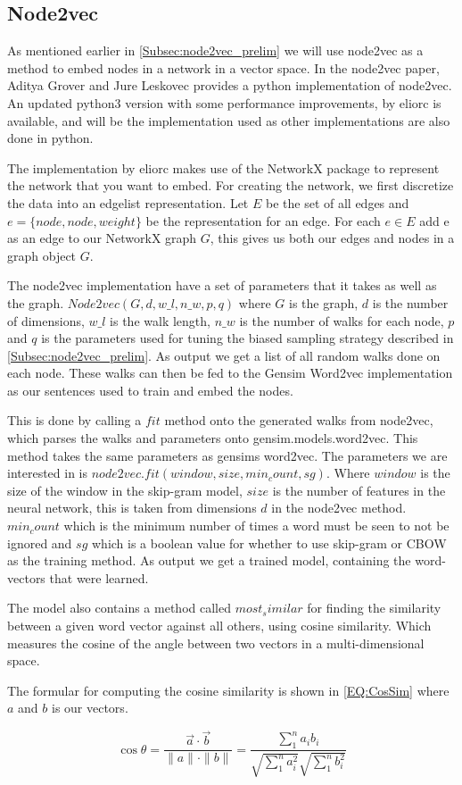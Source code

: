\subsection{Node2vec}
\label{Subsec:n2v_implementation}
As mentioned earlier in \ref{Subsec:node2vec_prelim} we will use node2vec as a method to embed nodes in a network in a vector space. In the node2vec paper, Aditya Grover and Jure Leskovec provides a python implementation of node2vec. An updated python3 version with some performance improvements, by eliorc\cite{n2v.eliorc} is available, and will be the implementation used as other implementations are also done in python.

The implementation by eliorc makes use of the NetworkX package to represent the network that you want to embed. For creating the network, we first discretize the data into an edgelist representation. Let $E$ be the set of all edges and $e = \{node, node, weight\}$ be the representation for an edge. For each $e \in E$ add e as an edge to our NetworkX graph $G$, this gives us both our edges and nodes in a graph object $G$.

The node2vec implementation have a set of parameters that it takes as well as the graph. $Node2vec(G, d, w\_l, n\_w, p, q)$ where $G$ is the graph, $d$ is the number of dimensions, $w\_l$ is the walk length, $n\_w$ is the number of walks for each node, $p$ and $q$ is the parameters used for tuning the biased sampling strategy described in \ref{Subsec:node2vec_prelim}. As output we get a list of all random walks done on each node. These walks can then be fed to the Gensim Word2vec\cite{Gensim.Word2vec} implementation as our sentences used to train and embed the nodes.

This is done by calling a $fit$ method onto the generated walks from node2vec, which parses the walks and parameters onto gensim.models.word2vec\cite{Gensim.Word2vec}. This method takes the same parameters as gensims word2vec. The parameters we are interested in is $node2vec.fit(window, size, min_count, sg)$. Where $window$ is the size of the window in the skip-gram model, $size$ is the number of features in the neural network, this is taken from dimensions $d$ in the node2vec method. $min_count$ which is the minimum number of times a word must be seen to not be ignored and $sg$ which is a boolean value for whether to use skip-gram or CBOW as the training method. As output we get a trained model, containing the word-vectors that were learned.

The model also contains a method called $most_similar$ for finding the similarity between a given word vector against all others, using cosine similarity. Which measures the cosine of the angle between two vectors in a multi-dimensional space.

The formular for computing the cosine similarity is shown in \ref{EQ:CosSim} where $a$ and $b$ is our vectors.

\begin{equation}\label{EQ:CosSim}
\cos\theta =
\frac{\vec{a}\cdot\vec{b}}{\parallel a\parallel
\cdot\parallel b\parallel} =
\frac{\sum_1^n a_i b_i}{\sqrt{\sum_1^n a_i^2}\sqrt{\sum_1^n b_i^2}}
\end{equation}
